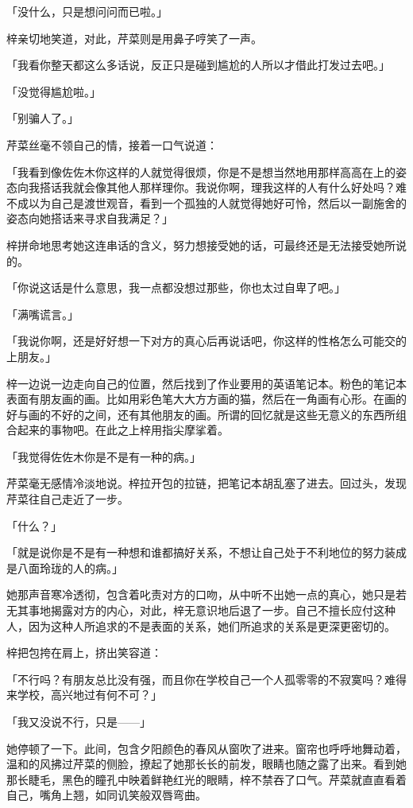 \documentclass[UTF8]{ctexart}
\begin{document}
    「没什么，只是想问问而已啦。」

    梓亲切地笑道，对此，芹菜则是用鼻子哼笑了一声。

    「我看你整天都这么多话说，反正只是碰到尴尬的人所以才借此打发过去吧。」

    「没觉得尴尬啦。」

    「别骗人了。」

    芹菜丝毫不领自己的情，接着一口气说道：

    「我看到像佐佐木你这样的人就觉得很烦，你是不是想当然地用那样高高在上的姿态向我搭话我就会像其他人那样理你。我说你啊，理我这样的人有什么好处吗？难不成以为自己是渡世观音，看到一个孤独的人就觉得她好可怜，然后以一副施舍的姿态向她搭话来寻求自我满足？」

    梓拼命地思考她这连串话的含义，努力想接受她的话，可最终还是无法接受她所说的。

    「你说这话是什么意思，我一点都没想过那些，你也太过自卑了吧。」

    「满嘴谎言。」

    「我说你啊，还是好好想一下对方的真心后再说话吧，你这样的性格怎么可能交的上朋友。」

    梓一边说一边走向自己的位置，然后找到了作业要用的英语笔记本。粉色的笔记本表面有朋友画的画。比如用彩色笔大大方方画的猫，然后在一角画有心形。在画的好与画的不好的之间，还有其他朋友的画。所谓的回忆就是这些无意义的东西所组合起来的事物吧。在此之上梓用指尖摩挲着。

    「我觉得佐佐木你是不是有一种的病。」

    芹菜毫无感情冷淡地说。梓拉开包的拉链，把笔记本胡乱塞了进去。回过头，发现芹菜往自己走近了一步。

    「什么？」

    「就是说你是不是有一种想和谁都搞好关系，不想让自己处于不利地位的努力装成是八面玲珑的人的病。」

    她那声音寒冷透彻，包含着叱责对方的口吻，从中听不出她一点的真心，她只是若无其事地揭露对方的内心，对此，梓无意识地后退了一步。自己不擅长应付这种人，因为这种人所追求的不是表面的关系，她们所追求的关系是更深更密切的。

    梓把包挎在肩上，挤出笑容道：

    「不行吗？有朋友总比没有强，而且你在学校自己一个人孤零零的不寂寞吗？难得来学校，高兴地过有何不可？」

    「我又没说不行，只是——」

    她停顿了一下。此间，包含夕阳颜色的春风从窗吹了进来。窗帘也呼呼地舞动着，温和的风拂过芹菜的侧脸，撩起了她那长长的前发，眼睛也随之露了出来。看到她那长睫毛，黑色的瞳孔中映着鲜艳红光的眼睛，梓不禁吞了口气。芹菜就直直看着自己，嘴角上翘，如同讥笑般双唇弯曲。
\end{document}
